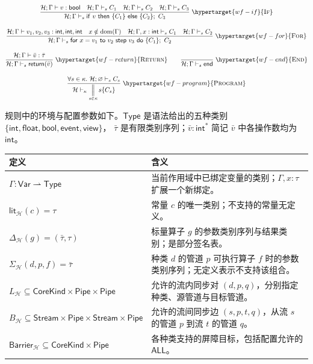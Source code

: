 \documentclass[UTF8,a4paper,11pt,fontset=fandol]{ctexart}
\newcommand{\kw}[1]{\ensuremath{\mathsf{#1}}}
\newcommand{\infer}[2]{\displaystyle\frac{\displaystyle #1}{\displaystyle #2}}
\begin{document}
\begin{equation*}
\begin{gathered}
\infer{\mathcal H;\Gamma\vdash v:\mathsf{bool}\quad\mathcal H;\Gamma\vdash_s C_1\quad\mathcal H;\Gamma\vdash_s C_2\quad\mathcal H;\Gamma\vdash_s C_3}
 {\mathcal H;\Gamma\vdash_s\kw{if}\ v\ \kw{then}\ \{C_1\}\ \kw{else}\ \{C_2\};\ C_3}
 \;\hypertarget{wf-if}{\textsc{If}}\\[1em]
\infer{\mathcal H;\Gamma\vdash v_1,v_2,v_3:\mathsf{int},\mathsf{int},\mathsf{int}\quad
 x\notin\mathrm{dom}(\Gamma)\quad\mathcal H;\Gamma,x:\mathsf{int}\vdash_s C_1\quad\mathcal H;\Gamma\vdash_s C_2}
 {\mathcal H;\Gamma\vdash_s\kw{for}\ x=v_1\ \kw{to}\ v_2\ \kw{step}\ v_3\ \kw{do}\ \{C_1\};\ C_2}
 \;\hypertarget{wf-for}{\textsc{For}}\\[1em]
\infer{\mathcal H;\Gamma\vdash\bar v:\bar\tau}{\mathcal H;\Gamma\vdash_s\kw{return}(\bar v)}
 \;\hypertarget{wf-return}{\textsc{Return}}
\qquad
\infer{}{\mathcal H;\Gamma\vdash_s\kw{end}}\;\hypertarget{wf-end}{\textsc{End}}\\[1em]
\infer{\forall s\in\kappa.\ \mathcal H;\varnothing\vdash_s C_s}
 {\mathcal H\vdash_\kappa\mathop{\Big\|}_{s\in\kappa}s\{C_s\}}
 \;\hypertarget{wf-program}{\textsc{Program}}
\end{gathered}
\end{equation*}
\endgroup

\noindent 规则中的环境与配置参数如下。$\mathsf{Type}$ 是语法给出的五种类别
$\{\mathsf{int},\mathsf{float},\mathsf{bool},\mathsf{event},\mathsf{view}\}$，
$\bar\tau$ 是有限类别序列；$\bar v:\mathsf{int}^*$ 简记 $\bar v$ 中各操作数均为 $\mathsf{int}$。
\begin{center}\small
\begin{tabularx}{\linewidth}{@{}lY@{}}
\toprule
定义 & 含义 \\
\midrule
$\Gamma:\mathsf{Var}\rightharpoonup\mathsf{Type}$
 & 当前作用域中已绑定变量的类别；$\Gamma,x:\tau$ 扩展一个新绑定。\\
$\mathsf{lit}_{\mathcal H}(c)=\tau$
 & 常量 $c$ 的唯一类别；不支持的常量无定义。\\
$\Delta_{\mathcal H}(g)=(\bar\tau,\tau)$
 & 标量算子 $g$ 的参数类别序列与结果类别；是部分签名表。\\
$\Sigma_{\mathcal H}(d,p,f)=\bar\tau$
 & 种类 $d$ 的管道 $p$ 可执行算子 $f$ 时的参数类别序列；无定义表示不支持该组合。\\
$L_{\mathcal H}\subseteq\mathsf{CoreKind}\times\mathsf{Pipe}\times\mathsf{Pipe}$
 & 允许的流内同步对 $(d,p,q)$，分别指定种类、源管道与目标管道。\\
$B_{\mathcal H}\subseteq\mathsf{Stream}\times\mathsf{Pipe}\times\mathsf{Stream}\times\mathsf{Pipe}$
 & 允许的流间同步边 $(s,p,t,q)$，从流 $s$ 的管道 $p$ 到流 $t$ 的管道 $q$。\\
$\mathsf{Barrier}_{\mathcal H}\subseteq\mathsf{CoreKind}\times\mathsf{Pipe}$
 & 各种类支持的屏障目标，包括配置允许的 $\mathsf{ALL}$。\\
\bottomrule
\end{tabularx}
\end{center}
\end{document}
